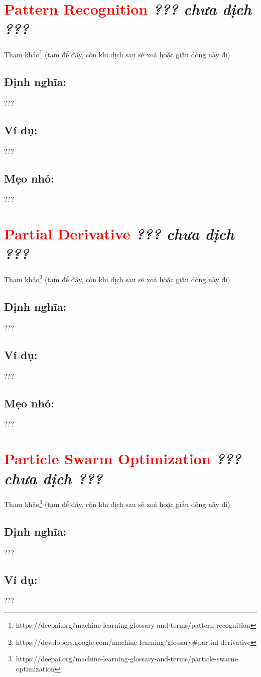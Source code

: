 \section*{\huge \textcolor{Red}{Pattern Recognition}  \small \textit{??? chưa dịch ???} }
Tham khảo\footnote{https://deepai.org/machine-learning-glossary-and-terms/pattern-recognition} (tạm để đây, còn khi dịch sau sẽ xoá hoặc giấu dòng này đi)
\subsection*{Định nghĩa:}
???
\subsection*{Ví dụ:}
???
\subsection*{Mẹo nhỏ:}
???
\section*{\huge \textcolor{Red}{Partial Derivative}  \small \textit{??? chưa dịch ???} }
Tham khảo\footnote{https://developers.google.com/machine-learning/glossary\#partial-derivative} (tạm để đây, còn khi dịch sau sẽ xoá hoặc giấu dòng này đi)
\subsection*{Định nghĩa:}
???
\subsection*{Ví dụ:}
???
\subsection*{Mẹo nhỏ:}
???
\section*{\huge \textcolor{Red}{Particle Swarm Optimization}  \small \textit{??? chưa dịch ???} }
Tham khảo\footnote{https://deepai.org/machine-learning-glossary-and-terms/particle-swarm-optimization} (tạm để đây, còn khi dịch sau sẽ xoá hoặc giấu dòng này đi)
\subsection*{Định nghĩa:}
???
\subsection*{Ví dụ:}
???
